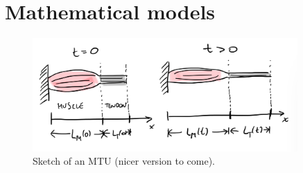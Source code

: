 \documentclass{sfuthesis}
\numberwithin{equation}{section}
\numberwithin{figure}{chapter}
\numberwithin{table}{chapter}
\theoremstyle{definition}
\begin{document}


\section{Mathematical models}

\begin{figure}
    \centering
    \includegraphics[width=0.9\textwidth]{mtu_sketch.jpeg}
    \caption{Sketch of an MTU (nicer version to come).}
    \label{fig:mtu_sketch}
\end{figure}
\end{document}
